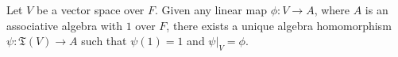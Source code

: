 Let $V$ be a vector space over $F$. Given any linear map $\phi: V \to A$, where $A$ is an associative algebra with $1$ over $F$, there exists a unique algebra homomorphism $\psi: \mathfrak{T}(V) \to A$ such that $\psi(1) = 1$ and $\psi|_V = \phi$.
